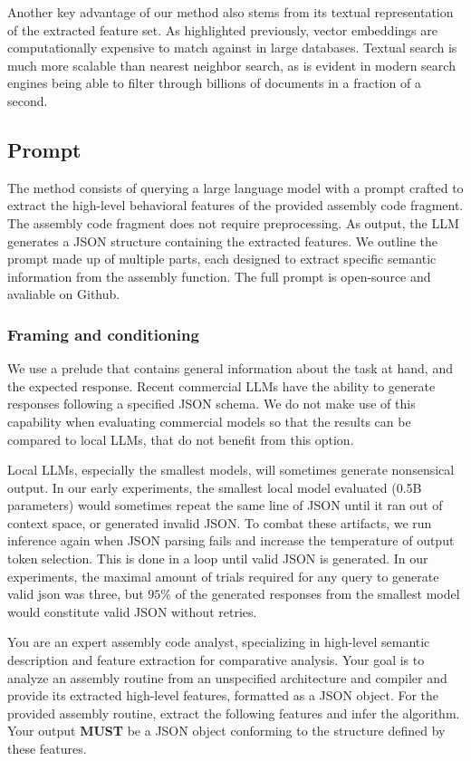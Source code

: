\documentclass[conference,compsoc]{IEEEtran}
\begin{document}
Another key advantage of our method also stems from its textual representation of the extracted feature set. As highlighted
previously, vector embeddings are computationally expensive to match against in large databases. Textual search is much
more scalable than nearest neighbor search, as is evident in modern search engines being able to filter through billions of documents
in a fraction of a second.

\subsection{Prompt}

The method consists of querying a large language model with a prompt crafted to extract the high-level behavioral features of
the provided assembly code fragment. The assembly code fragment does not require preprocessing. As output, the LLM generates a JSON
structure containing the extracted features. We outline the prompt made up of multiple parts, each designed to
extract specific semantic information from the assembly function. The full prompt is open-source and avaliable on Github.

\subsubsection{Framing and conditioning}

We use a prelude that contains general information about the task at hand, and the expected response.
Recent commercial LLMs have the ability to generate responses following a specified JSON schema. We do not
make use of this capability when evaluating commercial models so that the results can be compared to local LLMs,
that do not benefit from this option.

Local LLMs, especially the smallest models, will sometimes generate nonsensical output. In our early experiments, the smallest local model
evaluated (0.5B parameters) would sometimes repeat the same line of JSON until it ran out of context space, or generated invalid JSON.
To combat these artifacts, we run inference again when JSON parsing fails and increase the temperature of output token
selection. This is done in a loop until valid JSON is generated. In our experiments, the maximal amount of trials required
for any query to generate valid json was three, but \(95\%\) of the generated responses from the smallest model would constitute
valid JSON without retries.

\begin{tcolorbox}
You are an expert assembly code analyst, specializing in high-level semantic description and feature extraction for comparative
analysis. Your goal is to analyze an assembly routine from an unspecified architecture and compiler and provide its extracted
high-level features, formatted as a JSON object. For the provided assembly routine, extract the following features and infer the
algorithm. Your output \textbf{MUST} be a JSON object conforming to the structure defined by these features.
\end{tcolorbox}
\end{document}
